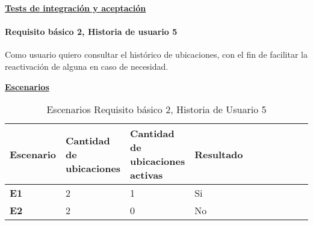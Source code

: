 \documentclass[../ei103948-project-documentation.tex]{subfiles}
\begin{document}
						\newpage

						\begin{center}
							\textbf{\underline{Tests de integración y aceptación}}
						\end{center}
	
						\testBasicoS

						\vspace*{5mm}


				\paragraph{Requisito básico 2, Historia de usuario 5}
				Como usuario quiero consultar el histórico de ubicaciones, con el fin de facilitar la reactivación de alguna en caso de necesidad.

				\begin{center}
					\textbf{\underline{Escenarios}}
					\begin{table}[H]
						\centering
						\begin{tabular}{|p{0.14\linewidth}|p{0.20\linewidth}|p{0.20\linewidth}|p{0.20\linewidth}|p{0.12\linewidth}|p{0.12\linewidth}|p{0.12\linewidth}|}
							\hline
							\textbf{Escenario} & \textbf{Cantidad de ubicaciones} & \textbf{Cantidad de ubicaciones activas} & \textbf{Resultado} \\ \hline
							\textbf{E1}        & 2                                & 1                                        & Si                 \\ \hline
							\textbf{E2}        & 2                                & 0                                        & No                 \\ \hline
							\end{tabular}
						\caption{Escenarios Requisito básico 2, Historia de Usuario 5}
					\end{table}

					\descripcionBasicaT
				
					\newpage


\end{center}
\end{document}
